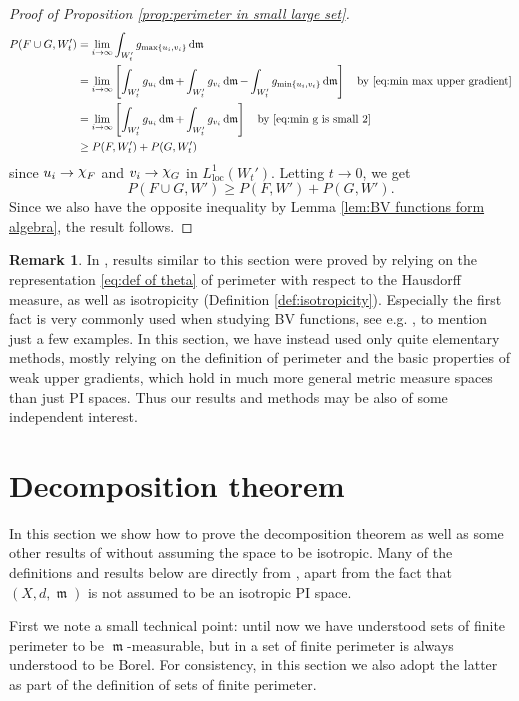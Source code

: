 \documentclass[11pt]{article}
\numberwithin{equation}{section}
\theoremstyle{plain}
\theoremstyle{definition}
\newtheorem{remark}[equation]{Remark}
\numberwithin{equation}{section}
\newcommand{\loc}{\mathrm{loc}}
\newcommand{\ch}{\text{\raise 1.3pt \hbox{$\chi$}\kern-0.2pt}}
\DeclareMathOperator{\frm}{\mathfrak{m}}
\DeclareMathOperator{\dfrm}{d\mathfrak{m}}
\begin{document}
\begin{proof}[Proof of Proposition \ref{prop:perimeter in small large set}]
\begin{align*}
P(F\cup G,W_t')
&=\lim_{i\to\infty}\int_{W_t'}g_{\max \{u_i,v_i\}}\dfrm\\
&=\lim_{i\to\infty}\left[\int_{W_t'}g_{u_i}\dfrm+\int_{W_t'}g_{v_i}\dfrm-
\int_{W_t'}g_{\min\{u_i,v_i\}}\dfrm \right]\quad\textrm{by }\eqref{eq:min max upper gradient}\\
&=\lim_{i\to\infty}\left[\int_{W_t'}g_{u_i}\dfrm+\int_{W_t'}g_{v_i}\dfrm\right]\quad
\textrm{by }\eqref{eq:min g is small 2}\\
&\ge P(F,W_t')+P(G,W_t')
\end{align*}
since $u_i\to \ch_F$ and $v_i\to \ch_G$ in $L^1_{\loc}(W_t')$.
Letting $t\to 0$, we get
\[
P(F\cup G,W')\ge P(F,W')+P(G,W').
\]
Since we also have the opposite inequality by Lemma \ref{lem:BV functions form algebra},
the result follows.
\end{proof}

\begin{remark}
In \cite[Section 2]{BPR}, results similar to this section were proved by relying on
the representation \eqref{eq:def of theta} of perimeter with respect to the Hausdorff measure,
as well as isotropicity (Definition \ref{def:isotropicity}).
Especially the first fact is very commonly used when studying BV functions,
see e.g. \cite{ACMM,AMP,KKST,L}, to mention just a few examples.
In this section, we have instead used only quite elementary methods, mostly
relying on the definition of perimeter and the basic properties of weak upper gradients,
which hold in much more general metric measure spaces than just PI spaces.
Thus our results and methods may be also of some independent interest. 
\end{remark}

\section{Decomposition theorem}\label{sec:decomposition}

In this section we show how to prove the decomposition theorem
as well as some other results of \cite{BPR} without assuming the space to be isotropic.
Many of the definitions and results below are directly from \cite{BPR}, apart from the fact that
$(X,d,\frm)$ is not assumed to be an isotropic PI space.

First we note a small technical point: until now we have understood
sets of finite perimeter to be $\frm$-measurable, but in \cite{BPR} a set of finite perimeter
is always understood to be Borel. For consistency, in this section we also adopt the latter as part of the
definition of sets of finite perimeter.
\end{document}
